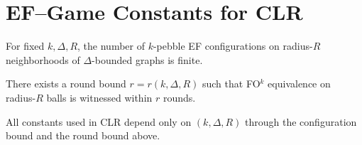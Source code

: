 \section*{EF--Game Constants for CLR}

\begin{lemma}
For fixed $k,\Delta,R$, the number of $k$-pebble EF configurations on radius-$R$ neighborhoods of $\Delta$-bounded graphs is finite.
\end{lemma}

\begin{lemma}
There exists a round bound $r=r(k,\Delta,R)$ such that FO$^k$ equivalence on radius-$R$ balls is witnessed within $r$ rounds.
\end{lemma}

\begin{proposition}
All constants used in CLR depend only on $(k,\Delta,R)$ through the configuration bound and the round bound above.
\end{proposition}

